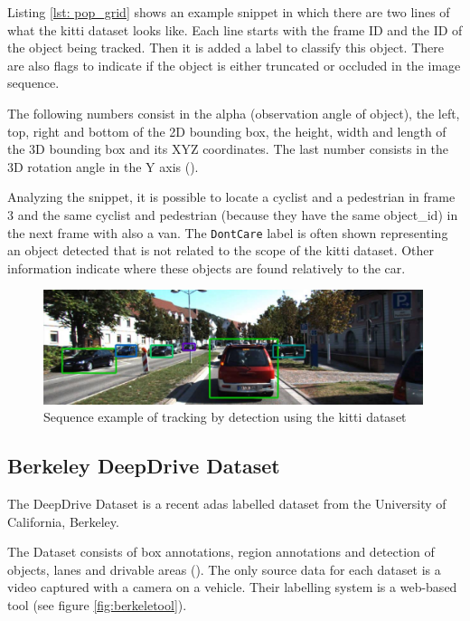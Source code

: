 Listing \ref{lst: pop_grid} shows an example snippet in which there are two lines of what the \gls{kitti} dataset looks like. Each line starts with the frame ID and the ID of the object being tracked. Then it is added a label to classify this object. There are also flags to indicate if the object is either truncated or occluded in the image sequence. 

The following numbers consist in the alpha (observation angle of object), the left, top, right and bottom of the 2D bounding box, the height, width and length of the 3D bounding box and its XYZ coordinates. The last number consists in the 3D rotation angle in the Y axis (\cite{Team}).

Analyzing the snippet, it is possible to locate a cyclist and a pedestrian in frame 3 and the same cyclist and pedestrian (because they have the same object\_id) in the next frame with also a van. The \texttt{DontCare} label is often shown representing an object detected that is not related to the scope of the \gls{kitti} dataset. Other information indicate where these objects are found relatively to the car.

\begin{figure}[htp]
	
	\centering
	\includegraphics[width=0.99\textwidth]{capstate/imgs/kittiresult}
	
	\caption{Sequence example of tracking by detection using the \gls{kitti} dataset}
	\label{fig:kittiresult}
	
\end{figure}

\subsection{Berkeley DeepDrive Dataset}

The DeepDrive Dataset is a recent \gls{adas} labelled dataset from the University of California, Berkeley.

The Dataset consists of box annotations, region annotations and detection of objects, lanes and drivable areas (\cite{Yu2018}). The only source data for each dataset is a video captured with a camera on a vehicle. Their labelling system is a web-based tool (see figure \ref{fig:berkeletool}). 

